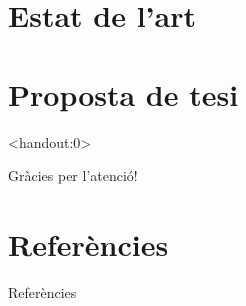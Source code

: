 \documentclass[
   catalan,
   ]{beamer}
\begin{document}
\section{Estat de l'art}



\section{Proposta de tesi}




\begin{frame}<handout:0>
  \addtocounter{framenumber}{-1}

  \begin{center}
    {\huge
      Gràcies per l'atenció!
    }
  \end{center}

\end{frame}



\section{Referències}
\begin{frame}[allowframebreaks]{Referències}

\printbibliography

\end{frame}
\end{document}
